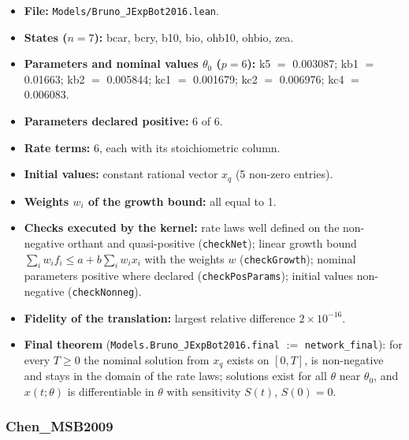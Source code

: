 \begin{itemize}\itemsep0pt\small
\item \textbf{File:} \texttt{Models/Bruno\_JExpBot2016.lean}.
\item \textbf{States ($n=7$):} bcar, bcry, b10, bio, ohb10, ohbio, zea.
\item \textbf{Parameters and nominal values $\theta_0$ ($p=6$):} k5 $=$ 0.003087; kb1 $=$ 0.01663; kb2 $=$ 0.005844; kc1 $=$ 0.001679; kc2 $=$ 0.006976; kc4 $=$ 0.006083.
\item \textbf{Parameters declared positive:} 6 of 6.
\item \textbf{Rate terms:} 6, each with its stoichiometric column.
\item \textbf{Initial values:} constant rational vector $x_q$ (5 non-zero entries).
\item \textbf{Weights $w_i$ of the growth bound:} all equal to 1.
\item \textbf{Checks executed by the kernel:} rate laws well defined on the non-negative orthant and quasi-positive (\texttt{checkNet}); linear growth bound $\sum_iw_if_i\le a+b\sum_iw_ix_i$ with the weights $w$ (\texttt{checkGrowth}); nominal parameters positive where declared (\texttt{checkPosParams}); initial values non-negative (\texttt{checkNonneg}).
\item \textbf{Fidelity of the translation:} largest relative difference $2\times10^{-16}$.
\item \textbf{Final theorem} (\texttt{Models.Bruno\_JExpBot2016.final} $:=$ \texttt{network\_final}): for every $T\ge0$ the nominal solution from $x_q$ exists on $[0,T]$, is non-negative and stays in the domain of the rate laws; solutions exist for all $\theta$ near $\theta_0$, and $x(t;\theta)$ is differentiable in $\theta$ with sensitivity $S(t)$, $S(0)=0$.
\end{itemize}

\subsubsection*{Chen\_MSB2009}

